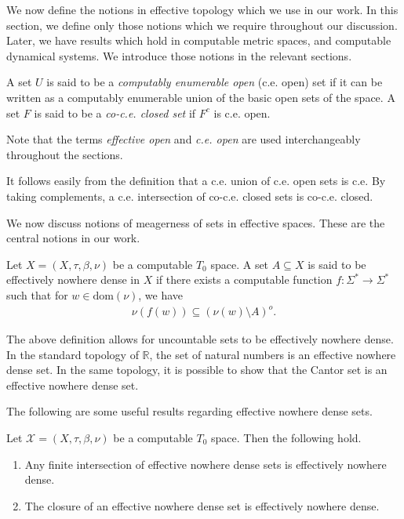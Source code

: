 \documentclass[a4paper,UKenglish,autoref,thm-restate,numberwithinsect]{lipics-v2021}
\newcommand{\R}{\mathbb{R}}
\newcommand{\X}{\mathcal{X}}
\begin{document}
We now define the notions in effective topology which we use in our work. In this section, we define only those notions which we require throughout our discussion. Later, we have results which hold in computable metric spaces, and computable dynamical systems. We introduce those notions in the relevant sections. 

\begin{definition}
	A set $U$ is said to be a \emph{computably enumerable open} (c.e. open) set if it can be written as a computably enumerable union of the basic open sets of the space. A set $F$ is said to be a \emph{co-c.e. closed set} if $F^c$ is c.e. open. 
\end{definition}

Note that the terms \textit{effective open} and \textit{c.e. open} are used interchangeably throughout the sections. 

It follows easily from the definition that a c.e. union of c.e. open sets is c.e. By taking complements, a c.e. intersection of co-c.e. closed sets is co-c.e. closed. 

We now discuss notions of meagerness of sets in effective spaces. These are the central notions in our work. 

\begin{definition}
	Let $X=(X,\tau,\beta,\nu)$ be a computable $T_0$ space. A set 	$A\subseteq X$ is said to be effectively nowhere dense in $X$ if there exists a computable function $f:\Sigma^*\to\Sigma^*$ such that for $w \in \text{dom}(\nu)$, we have 
	\begin{align}
		\nu(f(w))\subseteq(\nu(w)\setminus A)^o.
	\end{align}
\end{definition}

The above definition allows for uncountable sets to be effectively nowhere dense. In the standard topology of $\R$, the set of natural numbers is an effective nowhere dense set. In the same topology, it is possible to show that the Cantor set is an effective nowhere dense set. 

The following are some useful results regarding effective nowhere dense sets. 

\begin{lemma}
	\label{lem:effective_nowhere_dense}
	Let $\X=(X,\tau,\beta,\nu)$ be a computable $T_0$ space. Then the 	following hold. 
	\begin{enumerate}
		\item Any finite intersection of effective nowhere dense sets is 	effectively nowhere dense. 
		\item The closure of an effective nowhere dense set is effectively 	nowhere dense. 
	\end{enumerate}
\end{lemma}
\end{document}
